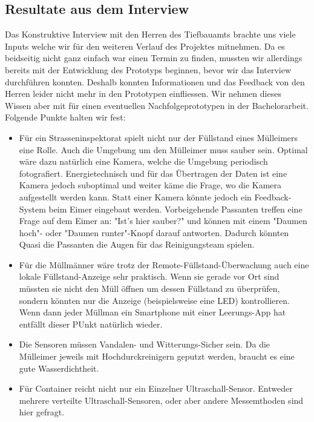 \subsection{Resultate aus dem Interview}
Das Konstruktive Interview mit den Herren des Tiefbauamts brachte uns viele Inputs welche wir für den weiteren Verlauf des Projektes mitnehmen.
Da es beidseitig nicht ganz einfach war einen Termin zu finden, mussten wir allerdings bereits mit der Entwicklung des Prototyps beginnen, bevor wir das Interview durchführen konnten. Deshalb konnten Informationen und das Feedback von den Herren leider nicht mehr in den Prototypen einfliessen. Wir nehmen dieses Wissen aber mit für einen eventuellen Nachfolgeprototypen in der Bachelorarbeit. Folgende Punkte halten wir fest:
\begin{itemize}  
  \item Für ein Strasseninspektorat spielt nicht nur der Füllstand eines Mülleimers eine Rolle. Auch die Umgebung um den Mülleimer muss sauber sein. Optimal wäre dazu natürlich eine Kamera, welche die Umgebung periodisch fotografiert. Energietechnisch und für das Übertragen der Daten ist eine Kamera jedoch suboptimal und weiter käme die Frage, wo die Kamera aufgestellt werden kann. Statt einer Kamera könnte jedoch ein Feedback-System beim Eimer eingebaut werden. Vorbeigehende Passanten treffen eine Frage auf dem Eimer an: "Ist's hier sauber?" und können mit einem "Daumen hoch"- oder "Daumen runter"-Knopf darauf antworten. Dadurch könnten Quasi die Passanten die Augen für das Reinigungsteam spielen.
  \item Für die Müllmänner wäre trotz der Remote-Füllstand-Überwachung auch eine lokale Füllstand-Anzeige sehr praktisch. Wenn sie gerade vor Ort sind müssten sie nicht den Müll öffnen um dessen Füllstand zu überprüfen, sondern könnten nur die Anzeige (beispielsweise eine LED) kontrollieren. Wenn dann jeder Müllman ein Smartphone mit einer Leerungs-App hat entfällt dieser PUnkt natürlich wieder.
  \item Die Sensoren müssen Vandalen- und Witterungs-Sicher sein. Da die Mülleimer jeweils mit Hochdurckreinigern geputzt werden, braucht es eine gute Wasserdichtheit.
  \item Für Container reicht nicht nur ein Einzelner Ultraschall-Sensor. Entweder mehrere verteilte Ultraschall-Sensoren, oder aber andere Messemthoden sind hier gefragt.
\end{itemize}
